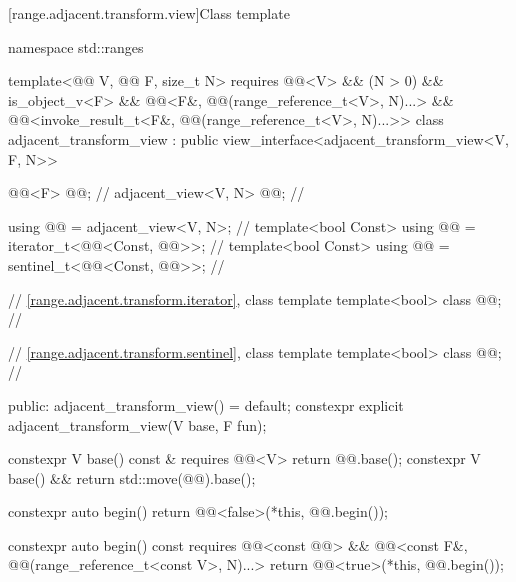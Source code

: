 [range.adjacent.transform.view]{Class template }

%
%
%
%
%
%
\begin{codeblock}
namespace std::ranges {
  template<@@ V, @@ F, size_t N>
    requires @@<V> && (N > 0) && is_object_v<F> &&
             @@<F&, @@(range_reference_t<V>, N)...> &&
             @@<invoke_result_t<F&, @@(range_reference_t<V>, N)...>>
  class adjacent_transform_view : public view_interface<adjacent_transform_view<V, F, N>> {
    @@<F> @@;                        // \expos
    adjacent_view<V, N> @@;                 // \expos

    using @@ = adjacent_view<V, N>;      // \expos
    template<bool Const>
      using @@ = iterator_t<@@<Const, @@>>;         // \expos
    template<bool Const>
      using @@ = sentinel_t<@@<Const, @@>>;         // \expos

    // \ref{range.adjacent.transform.iterator}, class template 
    template<bool> class @@;              // \expos

    // \ref{range.adjacent.transform.sentinel}, class template 
    template<bool> class @@;              // \expos

  public:
    adjacent_transform_view() = default;
    constexpr explicit adjacent_transform_view(V base, F fun);

    constexpr V base() const & requires @@<V> { return @@.base(); }
    constexpr V base() && { return std::move(@@).base(); }

    constexpr auto begin() {
      return @@<false>(*this, @@.begin());
    }

    constexpr auto begin() const
      requires @@<const @@> &&
               @@<const F&, @@(range_reference_t<const V>, N)...> {
      return @@<true>(*this, @@.begin());
    }

}}
\end{codeblock}
